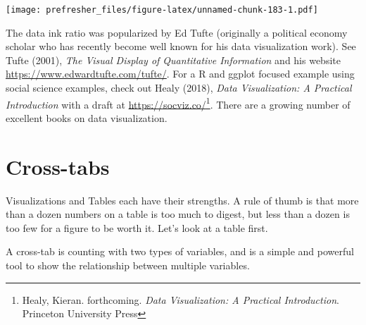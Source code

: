 \documentclass[]{book}
\newenvironment{Shaded}{\begin{snugshade}}{\end{snugshade}}
\newcommand{\DataTypeTok}[1]{\textcolor[rgb]{0.13,0.29,0.53}{#1}}
\newcommand{\KeywordTok}[1]{\textcolor[rgb]{0.13,0.29,0.53}{\textbf{#1}}}
\newcommand{\NormalTok}[1]{#1}
\newcommand{\OperatorTok}[1]{\textcolor[rgb]{0.81,0.36,0.00}{\textbf{#1}}}
\newcommand{\StringTok}[1]{\textcolor[rgb]{0.31,0.60,0.02}{#1}}
\let\rmarkdownfootnote\footnote%
\def\footnote{\protect\rmarkdownfootnote}
\theoremstyle{definition}
\theoremstyle{definition}
\theoremstyle{definition}
\theoremstyle{remark}
\begin{document}
\begin{Shaded}
\end{Shaded}

\texttt{[image: prefresher\_files/figure-latex/unnamed-chunk-183-1.pdf]}

The data ink ratio was popularized by Ed Tufte (originally a political economy scholar who has recently become well known for his data visualization work). See Tufte (2001), \emph{The Visual Display of Quantitative Information} and his website \url{https://www.edwardtufte.com/tufte/}. For a R and ggplot focused example using social science examples, check out Healy (2018), \emph{Data Visualization: A Practical Introduction} with a draft at \url{https://socviz.co/}\footnote{Healy, Kieran. forthcoming. \emph{Data Visualization: A Practical Introduction}. Princeton University Press}. There are a growing number of excellent books on data visualization.

\hypertarget{cross-tabs}{%
\section{Cross-tabs}\label{cross-tabs}}

Visualizations and Tables each have their strengths. A rule of thumb is that more than a dozen numbers on a table is too much to digest, but less than a dozen is too few for a figure to be worth it. Let's look at a table first.

A cross-tab is counting with two types of variables, and is a simple and powerful tool to show the relationship between multiple variables.
\end{document}
